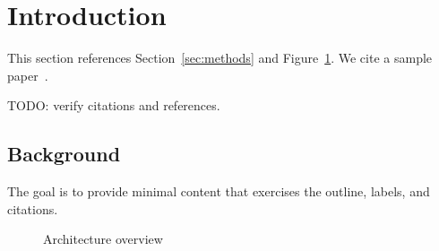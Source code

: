 \section{Introduction}\label{sec:intro}
This section references Section~\ref{sec:methods} and Figure~\ref{fig:arch}.
We cite a sample paper~\cite{smith2020}.

TODO: verify citations and references.

\subsection{Background}
The goal is to provide minimal content that exercises the outline, labels, and citations.

\begin{figure}[h]
\centering
\fbox{\rule{0pt}{2in}\rule{3in}{0pt}}
\caption{Architecture overview}
\label{fig:arch}
\end{figure}
